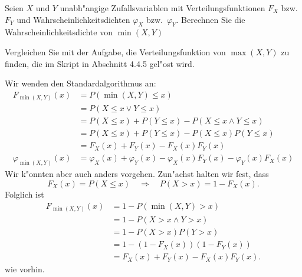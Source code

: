 Seien $X$ und $Y$  unabh"angige Zufallsvariablen mit Verteilungsfunktionen
$F_X$ bzw.~$F_Y$ und Wahrscheinlichkeitsdichten $\varphi_X$ bzw.~$\varphi_Y$.
Berechnen Sie die Wahrscheinlichkeitsdichte von $\min(X,Y)$

\begin{hinweis}
Vergleichen Sie mit der Aufgabe, die Verteilungsfunktion
von $\operatorname{max}(X, Y)$ zu finden, die im Skript in Abschnitt 4.4.5
gel"ost wird.
\end{hinweis}

\begin{loesung}
Wir wenden den Standardalgorithmus an:
\begin{align*}
F_{\min(X,Y)}(x)
&=
P(\min(X,Y)\le x)
\\
&=P(X\le x\vee Y\le x)
\\
&=P(X\le x) + P(Y\le x) - P(X\le x\wedge Y\le x)
\\
&=P(X\le x) + P(Y\le x) - P(X\le x)P(Y\le x)
\\
&=F_X(x)+F_Y(x)-F_X(x)F_Y(x)
\\
\varphi_{\min(X,Y)}(x)
&=
\varphi_X(x)+\varphi_Y(x)-\varphi_X(x)F_Y(x)-\varphi_Y(x)F_X(x)
\end{align*}
Wir k"onnten aber auch anders vorgehen. Zun"achst halten wir fest,
dass
\[
F_X(x)=P(X\le x)
\quad
\Rightarrow
\quad
P(X>x)=1-F_X(x).
\]
Folglich ist
\begin{align*}
F_{\min(X,Y)}(x)
&=
1-P(\min(X,Y) > x)
\\
&=
1-P(X>x\wedge Y>x)
\\
&=1-P(X>x)P(Y>x)
\\
&=1-(1-F_X(x))(1-F_Y(x))
\\
&=
F_X(x)+F_Y(x)-F_X(x)F_Y(x).
\end{align*}
wie vorhin.
\end{loesung}


